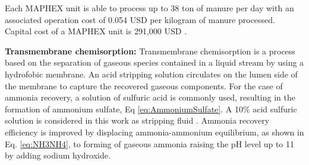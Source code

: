 \begin{refsection}[referencesCh6]

Each MAPHEX unit is able to process up to 38 ton of manure per day
with an associated operation cost of 
0.054 USD per kilogram of manure processed. Capital cost of a MAPHEX unit is 291,000 USD \citep{church_versatility_2018, church_novel_2016}.


\textbf{Transmembrane chemisorption:} Transmembrane chemisorption is a process based on the separation of gaseous species contained in a liquid stream by using a hydrofobic membrane. An acid stripping solution circulates on the lumen side of the membrane to capture the recovered gaseous components. For the case of ammonia recovery, a solution of sulfuric acid is commonly used, resulting in the formation of ammonium sulfate, Eq \ref{eq:AmmoniumSulfate}. A 10\% acid sulfuric solution is considered in this work as stripping fluid \citep{darestani2017hollow}. Ammonia recovery efficiency is improved by  displacing ammonia-ammonium equilibrium, as shown in Eq. \ref{eq:NH3NH4}, to forming of gaseous ammonia raising the pH level up to 11 by adding sodium hydroxide.


\end{refsection}
